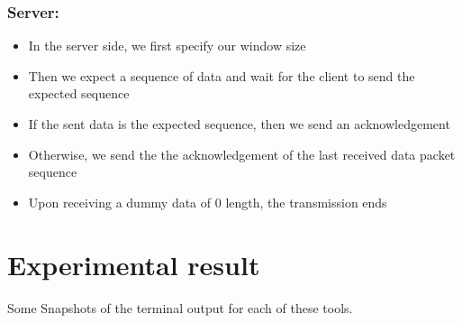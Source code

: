 \documentclass[11pt]{article}
\begin{document}
    \subsubsection{Server:}
        \begin{itemize}
            \item In the server side, we first specify our window size 
            \item Then we expect a sequence of data and wait for the client to send the expected sequence
            \item If the sent data is the expected sequence, then we send an acknowledgement
            \item Otherwise, we send the the acknowledgement of the last received data packet sequence
            \item Upon receiving a dummy data of 0 length, the transmission ends
        \end{itemize}

\newpage
\section{Experimental result}
Some Snapshots of the terminal output for each of these tools.
\end{document}
